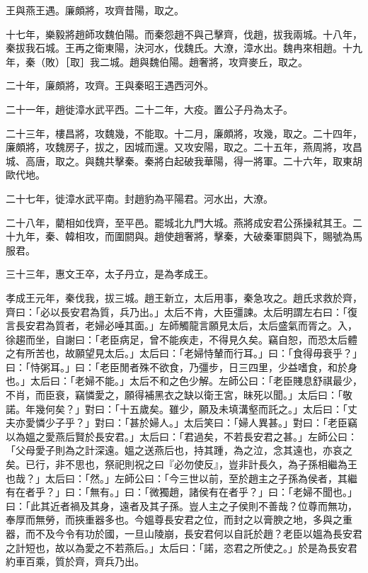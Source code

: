 \begin{pinyinscope}
王與燕王遇。廉頗將，攻齊昔陽，取之。

十七年，樂毅將趙師攻魏伯陽。而秦怨趙不與己擊齊，伐趙，拔我兩城。十八年，秦拔我石城。王再之衛東陽，決河水，伐魏氏。大潦，漳水出。魏冉來相趙。十九年，秦（敗）［取］我二城。趙與魏伯陽。趙奢將，攻齊麥丘，取之。

二十年，廉頗將，攻齊。王與秦昭王遇西河外。

二十一年，趙徙漳水武平西。二十二年，大疫。置公子丹為太子。

二十三年，樓昌將，攻魏幾，不能取。十二月，廉頗將，攻幾，取之。二十四年，廉頗將，攻魏房子，拔之，因城而還。又攻安陽，取之。二十五年，燕周將，攻昌城、高唐，取之。與魏共擊秦。秦將白起破我華陽，得一將軍。二十六年，取東胡歐代地。

二十七年，徙漳水武平南。封趙豹為平陽君。河水出，大潦。

二十八年，藺相如伐齊，至平邑。罷城北九門大城。燕將成安君公孫操弒其王。二十九年，秦、韓相攻，而圍閼與。趙使趙奢將，擊秦，大破秦軍閼與下，賜號為馬服君。

三十三年，惠文王卒，太子丹立，是為孝成王。

孝成王元年，秦伐我，拔三城。趙王新立，太后用事，秦急攻之。趙氏求救於齊，齊曰：「必以長安君為質，兵乃出。」太后不肯，大臣彊諫。太后明謂左右曰：「復言長安君為質者，老婦必唾其面。」左師觸龍言願見太后，太后盛氣而胥之。入，徐趨而坐，自謝曰：「老臣病足，曾不能疾走，不得見久矣。竊自恕，而恐太后體之有所苦也，故願望見太后。」太后曰：「老婦恃輦而行耳。」曰：「食得毋衰乎？」曰：「恃粥耳。」曰：「老臣閒者殊不欲食，乃彊步，日三四里，少益嗜食，和於身也。」太后曰：「老婦不能。」太后不和之色少解。左師公曰：「老臣賤息舒祺最少，不肖，而臣衰，竊憐愛之，願得補黑衣之缺以衛王宮，昧死以聞。」太后曰：「敬諾。年幾何矣？」對曰：「十五歲矣。雖少，願及未填溝壑而託之。」太后曰：「丈夫亦愛憐少子乎？」對曰：「甚於婦人。」太后笑曰：「婦人異甚。」對曰：「老臣竊以為媼之愛燕后賢於長安君。」太后曰：「君過矣，不若長安君之甚。」左師公曰：「父母愛子則為之計深遠。媼之送燕后也，持其踵，為之泣，念其遠也，亦哀之矣。已行，非不思也，祭祀則祝之曰『必勿使反』，豈非計長久，為子孫相繼為王也哉？」太后曰：「然。」左師公曰：「今三世以前，至於趙主之子孫為侯者，其繼有在者乎？」曰：「無有。」曰：「微獨趙，諸侯有在者乎？」曰：「老婦不聞也。」曰：「此其近者禍及其身，遠者及其子孫。豈人主之子侯則不善哉？位尊而無功，奉厚而無勞，而挾重器多也。今媼尊長安君之位，而封之以膏腴之地，多與之重器，而不及今令有功於國，一旦山陵崩，長安君何以自託於趙？老臣以媼為長安君之計短也，故以為愛之不若燕后。」太后曰：「諾，恣君之所使之。」於是為長安君約車百乘，質於齊，齊兵乃出。


\end{pinyinscope}
